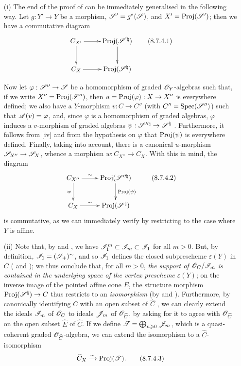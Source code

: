 \begin{remark}[8.7.4]
\label{II.8.7.4}
\begin{enumerate}
  \item[\rm{(i)}] The end of the proof of  can be immediately generalised in the following way.
    Let $g:Y'\to Y$ be a morphism, $\mathscr{S}'=g^*(\mathscr{S})$, and $X'=\operatorname{Proj}(\mathscr{S}')$;
    then we have a commutative diagram
    \[
    \label{II.8.7.4.1}
      \xymatrix{
        C_{X'}
          \ar[r]
          \ar[d]
      & \Proj(\sh{S}^{'\natural})
          \ar[d]
      \\C_X
          \ar[r]
      & \Proj(\sh{S}^\natural)
      }
    \tag{8.7.4.1}
    \]

    Now let $\varphi:\sh{S}''\to\sh{S}$ be a homomorphism of graded $\mathscr{O}_Y$-algebras such that, if we write $X''=\operatorname{Proj}(\mathscr{S}'')$, then $u=\Proj(\varphi):X\to X''$ is everywhere defined;
    we also have
    a $Y$-morphism $v:C\to C''$ (with $C''=\operatorname{Spec}(\mathscr{S}'')$) such that $\mathscr{A}(v)=\varphi$, and, since $\varphi$ is a homomorphism of graded algebras, $\varphi$ induces a $v$-morphism of graded algebras $\psi:\sh{S}^{\prime\prime\natural}\to\sh{S}^\natural$ .
    Furthermore, it follows from [iv] and from the hypothesis on $\varphi$ that $\operatorname{Proj}(\psi)$ is everywhere defined.
    Finally, taking  into account, there is a canonical $u$-morphism $\sh{S}_{X''}\to\sh{S}_X$, whence  a morphism $w:C_{X''}\to C_X$.
    With this in mind, the diagram
    \[
    \label{II.8.7.4.2}
      \xymatrix{
        C_{X''}
          \ar[r]^-{\sim}
          \ar[d]_{w}
      & \Proj(\sh{S}^{\prime\prime\natural})
          \ar[d]^{\Proj(\psi)}
      \\C_X
          \ar[r]^-{\sim}
      & \Proj(\sh{S}^\natural)
      }
    \tag{8.7.4.2}
    \]
    is commutative, as we can immediately verify by restricting to the case where $Y$ is affine.
  \item[\rm{(ii)}] Note that, by  and , we have $\mathscr{I}_1^m\subset\mathscr{I}_m\subset\mathscr{I}_1$ for all $m>0$.
    But, by definition, $\mathscr{I}_1=(\mathscr{S}_+)^\sim$, and so $\mathscr{I}_1$ defines the closed subprescheme $\varepsilon(Y)$ in $C$ ( and );
    we thus conclude that, for all $m>0$, \emph{the support of $\mathscr{O}_C/\mathscr{I}_m$ is contained in the underlying space of the vertex prescheme $\varepsilon(Y)$};
    on the inverse image of the pointed affine cone $E$, the structure morphism $\Proj(\sh{S}^\natural)\to C$ thus restricts to an \emph{isomorphism} (by  and ).
    Furthermore, by canonically identifying $C$ with an open subset of $\widehat{C}$ , we can clearly extend the ideals $\mathscr{I}_m$ of $\mathscr{O}_C$ to ideals $\mathscr{J}_m$ of $\mathscr{O}_{\widehat{C}}$, by asking for it to agree with $\mathscr{O}_{\widehat{C}}$ on the open subset $\widehat{E}$ of $\widehat{C}$.
    If we define $\mathscr{T}=\bigoplus_{n\geqslant 0}\mathscr{J}_m$, which is a quasi-coherent graded $\mathscr{O}_{\widehat{C}}$-algebra, we can extend the isomorphism  to a $\widehat{C}$-isomorphism
    \[
    \label{II.8.7.4.3}
      \widehat{C}_X \xrightarrow{\sim} \operatorname{Proj}(\mathscr{T}).
    \tag{8.7.4.3}
    \]


\end{enumerate}
\end{remark}

